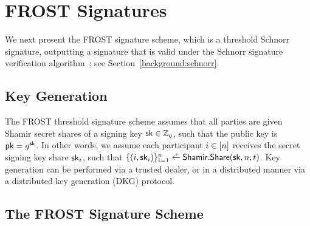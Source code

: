 

\section{FROST Signatures}

We next present the FROST signature scheme,
which is a threshold Schnorr signature,
outputting a signature that is valid under the Schnorr signature verification
algorithm~\cite{Schnorr91};
see Section~\ref{background:schnorr}.


\subsection{Key Generation}

The FROST threshold signature scheme assumes that all parties are given Shamir secret shares of a signing key $\mathsf{sk} \in \mathbb{Z}_q$,
such that the public key is $\mathsf{pk} = g^{\mathsf{sk}}$.
In other words,
we assume each participant $i \in [n]$ receives the secret signing key
share $\mathsf{sk}_i$,
such that $\{ (i, \sk_i) \}_{i=1}^n \rgets \shamir.\IssueShares(\sk, n, \thresh)$.
Key generation can be performed via a trusted dealer,
or in a distributed manner via a distributed key generation (DKG) protocol.

\subsection{The FROST Signature Scheme}

